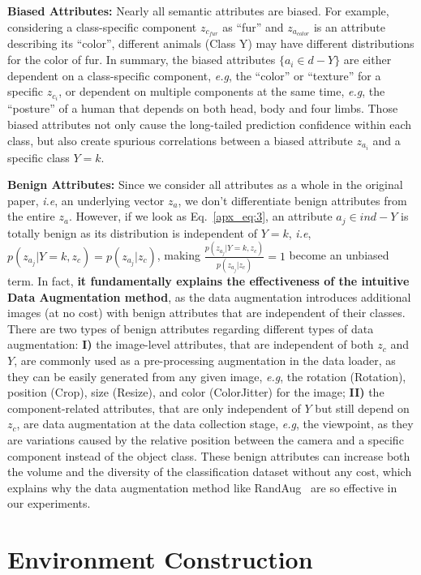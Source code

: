 \documentclass{article}
\def\eg{\emph{e.g}} \def\Eg{\emph{E.g}}
\def\ie{\emph{i.e}} \def\Ie{\emph{I.e}}
\begin{document}
\textbf{Biased Attributes:} Nearly all semantic attributes are biased. For example, considering a class-specific component $z_{c_{fur}}$ as ``fur'' and $z_{a_{color}}$ is an attribute describing its ``color'', different animals (Class Y) may have different distributions for the color of fur. In summary, the biased attributes $\{a_i \in d-Y\}$ are either dependent on a class-specific component, \eg, the ``color'' or ``texture'' for a specific $z_{c_i}$, or dependent on multiple components at the same time, \eg, the ``posture'' of a human that depends on both head, body and four limbs. Those biased attributes not only cause the long-tailed prediction confidence within each class, but also create spurious correlations between a biased attribute $z_{a_i}$ and a specific class $Y=k$. 

\textbf{Benign Attributes:} Since we consider all attributes as a whole in the original paper, \ie, an underlying vector $z_a$, we don't differentiate benign attributes from the entire $z_a$. However, if we look as Eq.~\eqref{apx_eq:3}, an attribute $a_j \in ind-Y$ is totally benign as its distribution is independent of $Y=k$, \ie, $p(z_{a_j}|Y=k,z_c) = p(z_{a_j}|z_c)$, making $\frac{p(z_{a_j}|Y=k,z_c)}{p(z_{a_j}|z_c)} = 1$ become an unbiased term. In fact, \textbf{it fundamentally explains the effectiveness of the intuitive Data Augmentation method}, as the data augmentation introduces additional images (at no cost) with benign attributes that are independent of their classes. There are two types of benign attributes regarding different types of data augmentation: \textbf{I)} the image-level attributes, that are independent of both $z_c$ and $Y$, are commonly used as a pre-processing augmentation in the data loader, as they can be easily generated from any given image, \eg, the rotation (Rotation), position (Crop), size (Resize), and color (ColorJitter) for the image; \textbf{II)} the component-related attributes, that are only independent of $Y$ but still depend on $z_c$, are data augmentation at the data collection stage, \eg, the viewpoint, as they are variations caused by the relative position between the camera and a specific component instead of the object class. These benign attributes can increase both the volume and the diversity of the classification dataset without any cost, which explains why the data augmentation method like RandAug~\cite{cubuk2020randaugment} are so effective in our experiments.


\section{Environment Construction} 
\end{document}
